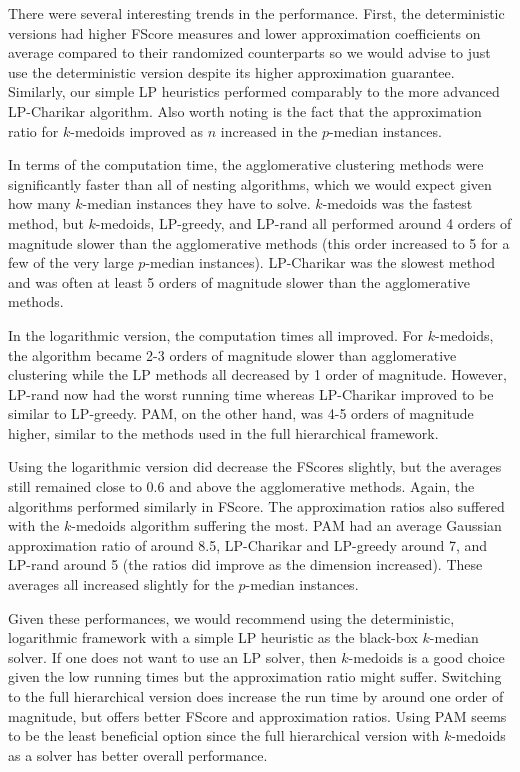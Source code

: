 \documentclass[conference, 10pt, final]{IEEEtran}
\begin{document}
There were several interesting trends in the performance. First, the deterministic versions had higher FScore measures and lower approximation coefficients on average compared to their randomized counterparts so we would advise to just use the deterministic version despite its higher approximation guarantee. Similarly, our simple LP heuristics performed comparably to the more advanced LP-Charikar algorithm. Also worth noting is the fact that the approximation ratio for $k$-medoids improved as $n$ increased in the $p$-median instances. 

In terms of the computation time, the agglomerative clustering methods were significantly faster than all of nesting algorithms, which we would expect given how many $k$-median instances they have to solve. $k$-medoids was the fastest method, but $k$-medoids, LP-greedy, and LP-rand all performed around 4 orders of magnitude slower than the agglomerative methods (this order increased to 5 for a few of the very large $p$-median instances). LP-Charikar was the slowest method and was often at least 5 orders of magnitude slower than the agglomerative methods. 

In the logarithmic version, the computation times all improved. For $k$-medoids, the algorithm became 2-3 orders of magnitude slower than agglomerative clustering while the LP methods all decreased by 1 order of magnitude. However, LP-rand now had the worst running time whereas LP-Charikar improved to be similar to LP-greedy. PAM, on the other hand, was 4-5 orders of magnitude higher, similar to the methods used in the full hierarchical framework. 

Using the logarithmic version did decrease the FScores slightly, but the averages still remained close to 0.6 and above the agglomerative methods. Again, the algorithms performed similarly in FScore. The approximation ratios also suffered with the $k$-medoids algorithm suffering the most. PAM had an average Gaussian approximation ratio of around 8.5, LP-Charikar and LP-greedy around 7, and LP-rand around 5 (the ratios did improve as the dimension increased). These averages all increased slightly for the $p$-median instances. 

Given these performances, we would recommend using the deterministic, logarithmic framework with a simple LP heuristic as the black-box $k$-median solver. If one does not want to use an LP solver, then $k$-medoids is a good choice given the low running times but the approximation ratio might suffer. Switching to the full hierarchical version does increase the run time by around one order of magnitude, but offers better FScore and approximation ratios. Using PAM seems to be the least beneficial option since the full hierarchical version with $k$-medoids as a solver has better overall performance.
\end{document}
